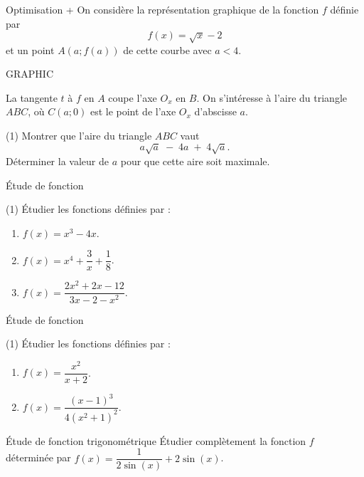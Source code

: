 \documentclass[a4paper,12pt]{article}
\begin{document}
\begin{activite}{Optimisation +}
\tcblower
On considère la représentation graphique de la fonction \(f\) définie par
\[
  f(x)=\sqrt{x}-2
\]
et un point \(A(a;f(a))\) de cette courbe avec \(a<4\).

\begin{center}
	GRAPHIC
\end{center}

La tangente \(t\) à \(f\) en \(A\) coupe l’axe \(O_x\) en \(B\). On s’intéresse à l’aire du triangle \(ABC\), où \(C(a;0)\) est le point de l’axe \(O_x\) d’abscisse \(a\).

\begin{tasks}(1)
  \task Montrer que l’aire du triangle \(ABC\) vaut
  \[
    a\sqrt{a} \;-\; 4a \;+\; 4\sqrt{a}.
  \]
  \task Déterminer la valeur de \(a\) pour que cette aire soit maximale.
\end{tasks}
\end{activite}

\begin{activite}{Étude de fonction}
\tcblower
\begin{tasks}(1)
  \task Étudier les fonctions définies par :
  \begin{enumerate}
    \item \(f(x)=x^3-4x\).
    \item \(f(x)=x^4+\dfrac{3}{x}+\dfrac{1}{8}\).
    \item \(f(x)=\dfrac{2x^2+2x-12}{3x-2-x^2}\).
  \end{enumerate}
\end{tasks}
\end{activite}

\begin{activite}{Étude de fonction}
\tcblower
\begin{tasks}(1)
  \task Étudier les fonctions définies par :
  \begin{enumerate}
    \item \(f(x)=\dfrac{x^2}{x+2}\).
    \item \(f(x)=\dfrac{(x-1)^3}{4(x^2+1)^2}\).
  \end{enumerate}
\end{tasks}
\end{activite}

\begin{activite}{Étude de fonction trigonométrique}
\tcblower
Étudier complètement la fonction $f$ déterminée par $f(x) = \dfrac{1}{2\sin(x)} + 2\sin(x)$.
\end{activite}
\end{document}
